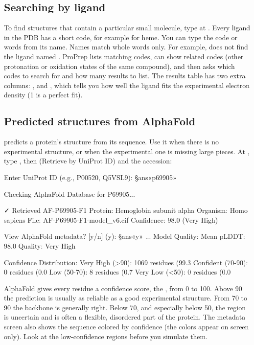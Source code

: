 \subsection{Searching by ligand}

To find structures that contain a particular small molecule, type  at
. Every ligand in the PDB has a short code, for example
 for heme. You can type the code or words from its name. Names
match whole words only. For example,  does not find
the ligand named . ProPrep lists matching codes, can show related
codes (other protonation or oxidation states of the same compound), and then
asks which codes to search for and how many results to list. The results table
has two extra columns: , and , which tells you how
well the ligand fits the experimental electron density (1 is a perfect fit).

\subsection{Predicted structures from AlphaFold}
\label{sec:structure-alphafold}

 predicts a protein's structure from its sequence. Use it when
there is no experimental structure, or when the experimental one is missing
large pieces. At , type , then 
(Retrieve by UniProt ID) and the accession:
\begin{screen}
Enter UniProt ID (e.g., P00520, Q5VSL9): §ans«p69905»

Checking AlphaFold Database for P69905...

✓ Retrieved AF-P69905-F1
  Protein: Hemoglobin subunit alpha
  Organism: Homo sapiens
  File: AF-P69905-F1-model_v6.cif
  Confidence: 98.0 (Very High)

View AlphaFold metadata? [y/n] (y): §ans«y»
...
Model Quality:
  Mean pLDDT: 98.0
  Quality: Very High

Confidence Distribution:
  Very High (>90): 1069 residues (99.3%
  Confident (70-90): 0 residues (0.0%
  Low (50-70): 8 residues (0.7%
  Very Low (<50): 0 residues (0.0%
\end{screen}

AlphaFold gives every residue a confidence score, the , from 0 to
100. Above 90 the prediction is usually as reliable as a good experimental
structure. From 70 to 90 the backbone is generally right. Below 70, and
especially below 50, the region is uncertain and is often a flexible, disordered
part of the protein. The metadata screen also shows the sequence colored by
confidence (the colors appear on screen only). Look at the low-confidence
regions before you simulate them.

